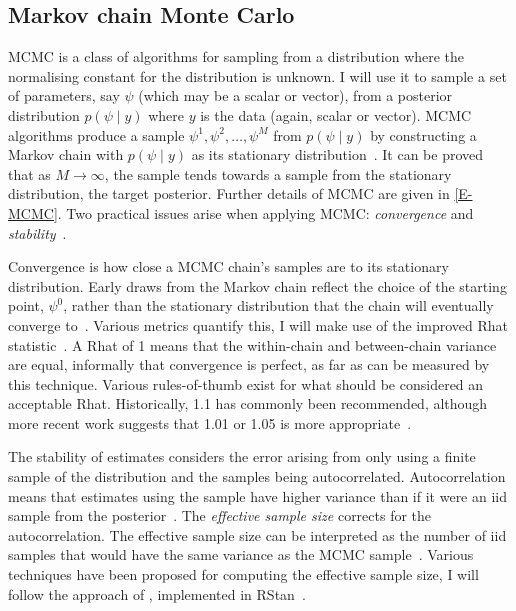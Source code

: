 \documentclass[thesis.tex]{subfiles}
\begin{document}
\subsection{Markov chain Monte Carlo} \label{intro:sec:MCMC}

MCMC is a class of algorithms for sampling from a distribution where the normalising constant for the distribution is unknown.
I will use it to sample a set of parameters, say $\psi$ (which may be a scalar or vector), from a posterior distribution $p(\psi \mid y)$ where $y$ is the data (again, scalar or vector).
MCMC algorithms produce a sample $\psi^1, \psi^2, \dots, \psi^M$ from $p(\psi \mid y)$ by constructing a Markov chain with $p(\psi \mid y)$ as its stationary distribution~\autocite[275]{gelmanBDA}.
It can be proved that as $M\to\infty$, the sample tends towards a sample from the stationary distribution, \ie the target posterior.
Further details of MCMC are given in \cref{E-MCMC}.
Two practical issues arise when applying MCMC: \emph{convergence} and \emph{stability}~\autocite[72]{lunnBUGS}.

Convergence is how close a MCMC chain's samples are to its stationary distribution.
Early draws from the Markov chain reflect the choice of the starting point, $\psi^0$, rather than the stationary distribution that the chain will eventually converge to~\autocite[282]{gelmanBDA}.
Various metrics quantify this, I will make use of the improved Rhat statistic~\autocite{vehtariRhat}.
A Rhat of 1 means that the within-chain and between-chain variance are equal, informally that convergence is perfect, as far as can be measured by this technique.
Various rules-of-thumb exist for what should be considered an acceptable Rhat.
Historically, 1.1 has commonly been recommended, although more recent work suggests that 1.01 or 1.05 is more appropriate~\autocite{vehtariRhat}.

The stability of estimates considers the error arising from only using a finite sample of the distribution and the samples being autocorrelated.
Autocorrelation means that estimates using the sample have higher variance than if it were an iid sample from the posterior~\autocite[286]{gelmanBDA}.
The \emph{effective sample size} corrects for the autocorrelation.
The effective sample size can be interpreted as the number of iid samples that would have the same variance as the MCMC sample~\autocites[286]{gelmanBDA}{vehtariRhat}.
Various techniques have been proposed for computing the effective sample size, I will follow the approach of \textcite{vehtariRhat}, implemented in RStan~\autocite{RStan-2-32-3}.
\end{document}
